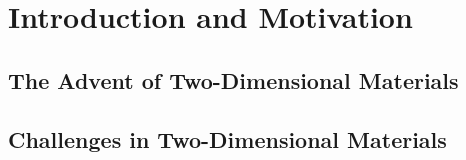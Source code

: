 \graphicspath{{./figs/chap1/}} %
\chapter{Introduction and Motivation}\label{chap:one}
\section{The Advent of Two-Dimensional Materials}\label{sec:2d_materials}
\section{Challenges in Two-Dimensional Materials}\label{sec:2d_challenges}



